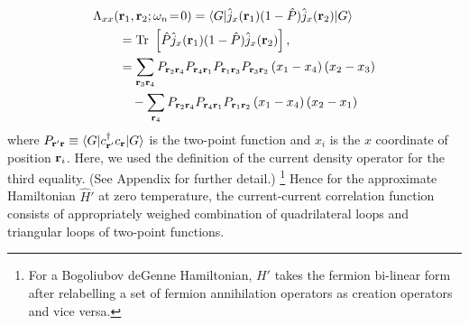 \documentclass[amsmath,amssymb, aps, prl, twocolumn]{revtex4-1}
\begin{document}
\begin{equation}
\left. \begin{aligned}
\Lambda_{xx}(&{\bf r}_1,{\bf r}_2;\omega_n\!=\!0)
= \langle G|\hat{j}_x({\bf r}_1)(1-\hat{P}) \hat{j}_x({\bf r}_2)|G\rangle \\
   &={\rm Tr}\ \left[\hat{P}\hat{j}_x({\bf r}_1)(1-\hat{P}) \hat{j}_x({\bf r}_2)\right],\\
&= \sum_{{\bf r}_3 {\bf r}_4}P_{{\bf r}_2 {\bf r}_4}P_{{\bf r}_4{\bf r}_1}P_{{\bf r}_1{\bf r}_3}P_{{\bf r}_3{\bf r}_2}\left(x_1-x_4\right)\left(x_2-x_3\right) \\
& \quad - \sum_{{\bf r}_4}P_{{\bf r}_2 {\bf r}_4}P_{{\bf r}_4{\bf r}_1}P_{{\bf r}_1{\bf r}_2}\left(x_1-x_4\right)\left(x_2-x_1\right)
\end{aligned}
\right.
\label{eq:j-j}
\end{equation}
where $P_{{\bf r}'{\bf r}}\equiv \langle G|c^\dagger_{{\bf r}'} c_{\bf r}|G\rangle $ is the two-point function and $x_i$ is the $x$ coordinate of position ${\bf r}_i$. Here, we used the definition of the current density operator for the third equality. (See Appendix for further detail.) \footnote{{\color{blue}For a Bogoliubov deGenne Hamiltonian, $H'$ takes the fermion bi-linear form after relabelling a set of fermion annihilation operators as creation operators and vice versa. }}
Hence for the approximate Hamiltonian $\hat{H}'$ at zero temperature, the current-current correlation function consists of appropriately weighed combination of quadrilateral loops and triangular loops of two-point functions.
\end{document}
